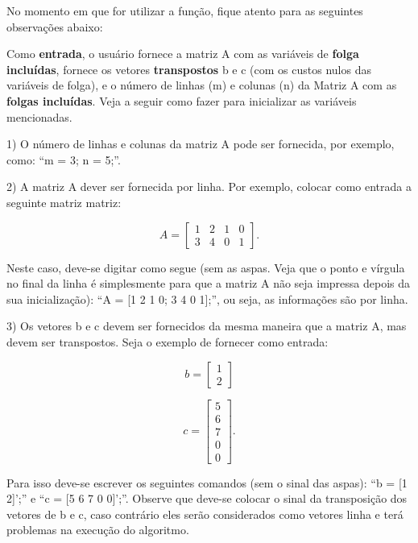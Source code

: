 \documentclass[10pt]{article}
\begin{document}
No momento em que for utilizar a função, fique atento para as seguintes observações abaixo:
\newline

Como \textbf{entrada}, o usuário fornece a matriz A com as variáveis de \textbf{folga incluídas}, fornece os vetores \textbf{transpostos} b e c (com os custos nulos das variáveis de folga), e o número de linhas (m) e colunas (n) da Matriz A com as \textbf{folgas incluídas}. Veja a seguir como fazer para inicializar as variáveis mencionadas.
\newline

1) O número de linhas e colunas da matriz A pode ser fornecida, por exemplo, como: ``m = 3; n = 5;''.
\newline

2) A matriz A dever ser fornecida por linha. Por exemplo, colocar como entrada a seguinte matriz matriz:

\[
A =
  \begin{bmatrix}
    1 & 2 & 1 & 0\\
    3 & 4 & 0 & 1
  \end{bmatrix}.
\]
\newline

Neste caso, deve-se digitar como segue (sem as aspas. Veja que o ponto e vírgula no final da linha é simplesmente para que a matriz A não seja impressa depois da sua inicialização): ``A = [1 2 1 0; 3 4 0 1];'', ou seja, as informações são por linha.
\newline

3) Os vetores b e c devem ser fornecidos da mesma maneira que a matriz A, mas devem ser transpostos. Seja o exemplo de fornecer como entrada:

\[
b = 
  \begin{bmatrix}
	1\\
	2
  \end{bmatrix}
\]

\[
c = 
  \begin{bmatrix}
	5\\
	6\\
	7\\
	0\\
	0
  \end{bmatrix}.
\]

Para isso deve-se escrever os seguintes comandos (sem o sinal das aspas): ``b = [1 2]';'' e ``c = [5 6 7 0 0]';''. Observe que deve-se colocar o sinal da transposição dos vetores de b e c, caso contrário eles serão considerados como vetores linha e terá problemas na execução do algoritmo.
\newline
\end{document}
